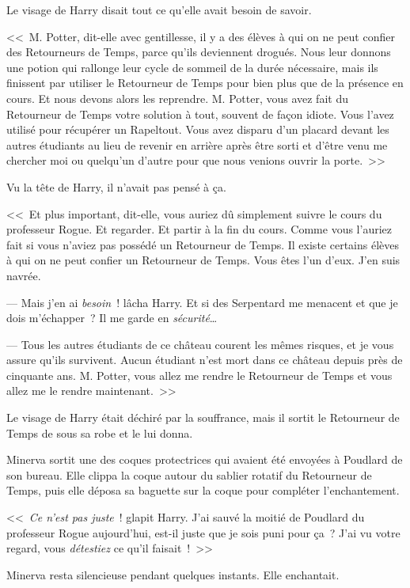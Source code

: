Le visage de Harry disait tout ce qu'elle avait besoin de savoir.

<<~M. Potter, dit-elle avec gentillesse, il y a des élèves à qui on ne peut confier des Retourneurs de Temps, parce qu'ils deviennent drogués. Nous leur donnons une potion qui rallonge leur cycle de sommeil de la durée nécessaire, mais ils finissent par utiliser le Retourneur de Temps pour bien plus que de la présence en cours. Et nous devons alors les reprendre. M. Potter, vous avez fait du Retourneur de Temps votre solution à tout, souvent de façon idiote. Vous l'avez utilisé pour récupérer un Rapeltout. Vous avez disparu d'un placard devant les autres étudiants au lieu de revenir en arrière après être sorti et d'être venu me chercher moi ou quelqu'un d'autre pour que nous venions ouvrir la porte.~>>

Vu la tête de Harry, il n'avait pas pensé à ça.

<<~Et plus important, dit-elle, vous auriez dû simplement suivre le cours du professeur Rogue. Et regarder. Et partir à la fin du cours. Comme vous l'auriez fait si vous n'aviez pas possédé un Retourneur de Temps. Il existe certains élèves à qui on ne peut confier un Retourneur de Temps. Vous êtes l'un d'eux. J'en suis navrée.

--- Mais j'en ai \emph{besoin}~! lâcha Harry. Et si des Serpentard me menacent et que je dois m'échapper~? Il me garde en \emph{sécurité}…

--- Tous les autres étudiants de ce château courent les mêmes risques, et je vous assure qu'ils survivent. Aucun étudiant n'est mort dans ce château depuis près de cinquante ans. M. Potter, vous allez me rendre le Retourneur de Temps et vous allez me le rendre maintenant.~>>

Le visage de Harry était déchiré par la souffrance, mais il sortit le Retourneur de Temps de sous sa robe et le lui donna.

Minerva sortit une des coques protectrices qui avaient été envoyées à Poudlard de son bureau. Elle clippa la coque autour du sablier rotatif du Retourneur de Temps, puis elle déposa sa baguette sur la coque pour compléter l'enchantement.

<<~\emph{Ce n'est pas juste}~! glapit Harry. J'ai sauvé la moitié de Poudlard du professeur Rogue aujourd'hui, est-il juste que je sois puni pour ça~? J'ai vu votre regard, vous \emph{détestiez} ce qu'il faisait~!~>>

Minerva resta silencieuse pendant quelques instants. Elle enchantait.

